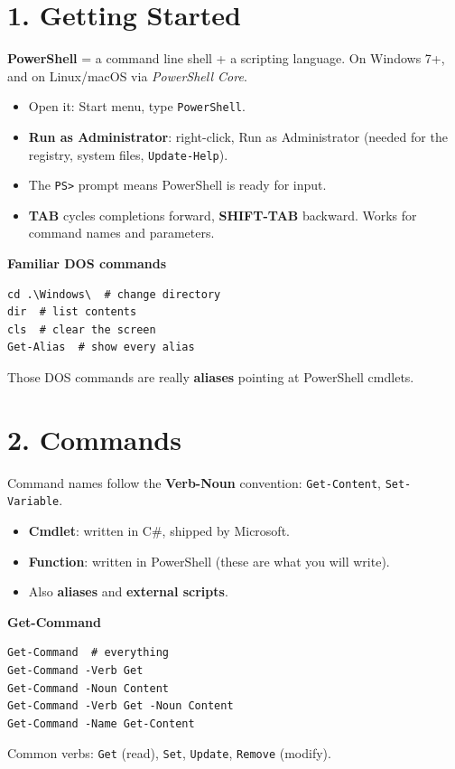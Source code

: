\section{1. Getting Started}
\textbf{PowerShell} = a command line shell + a scripting language. On Windows 7+, and on Linux/macOS via \emph{PowerShell Core}.
\begin{itemize}
\item Open it: Start menu, type \texttt{PowerShell}.
\item \textbf{Run as Administrator}: right-click, Run as Administrator (needed for the registry, system files, \texttt{Update-Help}).
\item The \texttt{PS>} prompt means PowerShell is ready for input.
\item \textbf{TAB} cycles completions forward, \textbf{SHIFT-TAB} backward. Works for command names and parameters.
\end{itemize}

\textbf{Familiar DOS commands}

\begin{verbatim}
cd .\Windows\  # change directory
dir  # list contents
cls  # clear the screen
Get-Alias  # show every alias
\end{verbatim}
Those DOS commands are really \textbf{aliases} pointing at PowerShell cmdlets.

\section{2. Commands}
Command names follow the \textbf{Verb-Noun} convention: \texttt{Get-Content}, \texttt{Set-Variable}.
\begin{itemize}
\item \textbf{Cmdlet}: written in C\#, shipped by Microsoft.
\item \textbf{Function}: written in PowerShell (these are what you will write).
\item Also \textbf{aliases} and \textbf{external scripts}.
\end{itemize}

\textbf{Get-Command}

\begin{verbatim}
Get-Command  # everything
Get-Command -Verb Get
Get-Command -Noun Content
Get-Command -Verb Get -Noun Content
Get-Command -Name Get-Content
\end{verbatim}
Common verbs: \texttt{Get} (read), \texttt{Set}, \texttt{Update}, \texttt{Remove} (modify).

